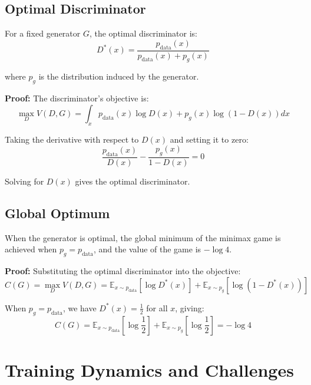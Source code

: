 \subsection{Optimal Discriminator}

For a fixed generator $G$, the optimal discriminator is:
\begin{equation}
    D^*(x) = \frac{p_{\text{data}}(x)}{p_{\text{data}}(x) + p_g(x)}
\end{equation}

where $p_g$ is the distribution induced by the generator.

\textbf{Proof:} The discriminator's objective is:
\begin{equation}
    \max_D V(D, G) = \int_x p_{\text{data}}(x) \log D(x) + p_g(x) \log(1 - D(x)) dx
\end{equation}

Taking the derivative with respect to $D(x)$ and setting it to zero:
\begin{equation}
    \frac{p_{\text{data}}(x)}{D(x)} - \frac{p_g(x)}{1 - D(x)} = 0
\end{equation}

Solving for $D(x)$ gives the optimal discriminator.

\subsection{Global Optimum}

When the generator is optimal, the global minimum of the minimax game is achieved when $p_g = p_{\text{data}}$, and the value of the game is $-\log 4$.

\textbf{Proof:} Substituting the optimal discriminator into the objective:
\begin{equation}
    C(G) = \max_D V(D, G) = \mathbb{E}_{x \sim p_{\text{data}}}[\log D^*(x)] + \mathbb{E}_{x \sim p_g}[\log(1 - D^*(x))]
\end{equation}

When $p_g = p_{\text{data}}$, we have $D^*(x) = \frac{1}{2}$ for all $x$, giving:
\begin{equation}
    C(G) = \mathbb{E}_{x \sim p_{\text{data}}}[\log \frac{1}{2}] + \mathbb{E}_{x \sim p_g}[\log \frac{1}{2}] = -\log 4
\end{equation}

\section{Training Dynamics and Challenges}

